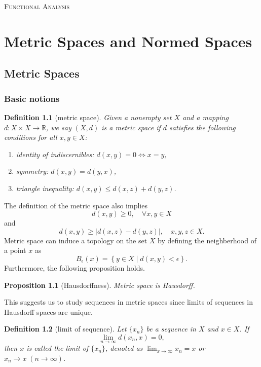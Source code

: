 \documentclass{report}
\newtheorem{definition}{Definition}[section]
\newtheorem{proposition}{Proposition}[section]
\theoremstyle{nonumberplain}
\begin{document}
\begin{center}
	\textsc{\Huge Functional Analysis}
	~\\
	\vspace{1em}  
	
\end{center}
\vspace{1em} 
\tableofcontents
\chapter{Metric Spaces and Normed Spaces}
\section{Metric Spaces}
\subsection{Basic notions}
\begin{definition}[metric space]
	Given a nonempty set $X$ and a mapping $d:X\times X\to \mathbb{R}$, we say $(X,d)$ is a \emph{metric space} if $d$ satisfies the following conditions for all $x,y\in X$:
	\begin{enumerate}
		\item identity of indiscernibles: $d(x,y)=0\iff x=y$,
		\item symmetry: $d(x,y)=d(y,x)$,
		\item triangle inequality: $d(x,y)\le d(x,z)+d(y,z)$.
	\end{enumerate}	
\end{definition}

\noindent The definition of the metric space also implies
\[
	d(x,y)\ge 0,\quad\forall x,y\in X
\]
and 
\[
	d(x,y)\ge|d(x,z)-d(y,z)|,\quad x,y,z\in X.
\]
Metric space can induce a topology on the set $X$ by defining the neighberhood of a point $x$ as 
\[
	B_\epsilon(x)=\left\{y\in X\mid d(x,y)<\epsilon \right\}.
\]
Furthermore, the following proposition holds.

\begin{proposition}[Hausdorffness]
	Metric space is Hausdorff.
\end{proposition}
This suggests us to study sequences in metric spaces since limits of sequences in Hausdorff spaces are unique. 
\begin{definition}[limit of sequence]
	Let $\{x_n\}$ be a sequence in $X$ and $x\in X$. If
	\[
		\lim_{n\to\infty}d(x_n,x)=0,
	\]
	then $x$ is called the \emph{limit} of $\{x_n\}$, denoted as $\lim_{x\to\infty}x_n=x$ or $x_n\to x\;(n\to\infty)$.
\end{definition}
\end{document}

